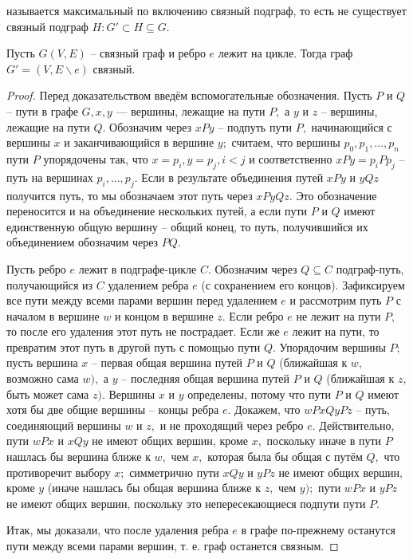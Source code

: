 \begin{definition}
     называется максимальный по включению связный подграф, то есть не существует связный подграф $H: G' \subset H \subseteq G.$
\end{definition}

\begin{lemma}
    Пусть $G(V, E)$ -- связный граф и ребро $e$ лежит на цикле.  Тогда граф $G' = (V, E \backslash {e})$ связный.
\end{lemma}
\begin{proof}
Перед доказательством введём вспомогательные обозначения. Пусть $P$ и $Q$ -- пути в графе $G, x, y$ — вершины, лежащие на пути $P,$ а $y$ и $z$ -- вершины, лежащие на пути $Q.$ Обозначим через $xPy$ -- подпуть пути $P,$ начинающийся с вершины $x$ и заканчивающийся в вершине $y;$ считаем, что вершины $p_0, p_1, \dots , p_n$ пути $P$ упорядочены так, что $x = p_i, y = p_j, i < j$ и соответственно $xPy = p_iPp_j$ -- путь на вершинах $p_i, \dots , p_j.$ Если в результате объединения путей $xPy$ и $yQz$ получится путь, то мы обозначаем этот путь через $xPyQz.$ Это обозначение переносится и на объединение нескольких путей, а если пути $P$ и $Q$ имеют единственную общую вершину -- общий конец, то путь, получившийся их объединением обозначим через $P Q.$

Пусть ребро $e$ лежит в подграфе-цикле $C.$ Обозначим через 
$Q \subseteq C$ подграф-путь, получающийся из $C$ удалением ребра $e$ (с сохранением его концов). Зафиксируем все пути между всеми парами вершин перед удалением $e$ и рассмотрим путь $P$ с началом в вершине $w$ и концом в вершине $z.$ Если ребро $e$ не лежит на пути $P,$ то после его удаления этот путь не пострадает. Если же $e$ лежит на пути, то превратим этот путь в другой путь с помощью пути $Q.$ Упорядочим вершины $P;$ пусть вершина $x$ -- первая общая вершина путей $P$ и $Q$ (ближайшая к $w,$ возможно сама $w),$ а $y$ -- последняя общая вершина путей $P$ и $Q$ (ближайшая к $z,$ быть может сама $z).$ Вершины $x$ и $y$ определены, потому что пути $P$ и $Q$ имеют хотя бы две общие вершины -- концы ребра $e.$ Докажем, что $wPxQyPz$ -- путь, соединяющий вершины $w$ и $z,$ и не проходящий через ребро $e.$ Действительно, пути $wPx$ и $xQy$ не имеют общих вершин, кроме $x,$ поскольку иначе в пути $P$ нашлась бы вершина ближе к $w,$ чем $x,$ которая была бы общая с путём $Q,$ что противоречит выбору $x;$ симметрично пути $xQy$ и $yPz$ не имеют общих вершин, кроме $y$ (иначе нашлась бы общая вершина ближе к $z,$ чем $y);$ пути $wPx$ и $yPz$ не имеют общих вершин, поскольку это непересекающиеся подпути пути $P.$

Итак, мы доказали, что после удаления ребра $e$ в графе по-прежнему останутся пути между всеми парами вершин, т. е. граф останется связным.
\end{proof}
